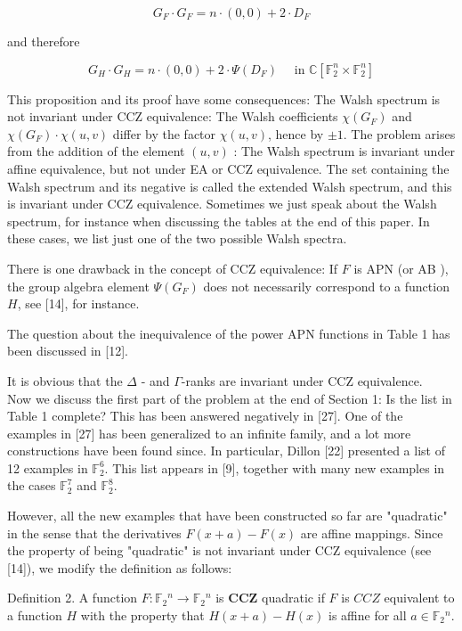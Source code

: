 \documentclass[10pt]{article}
\begin{document}
$$
G_{F} \cdot G_{F}=n \cdot(0,0)+2 \cdot D_{F}
$$

and therefore

$$
G_{H} \cdot G_{H}=n \cdot(0,0)+2 \cdot \Psi\left(D_{F}\right) \quad \text { in } \mathbb{C}\left[\mathbb{F}_{2}^{n} \times \mathbb{F}_{2}^{n}\right]
$$

This proposition and its proof have some consequences: The Walsh spectrum is not invariant under CCZ equivalence: The Walsh coefficients $\chi\left(G_{F}\right)$ and $\chi\left(G_{F}\right) \cdot \chi(u, v)$ differ by the factor $\chi(u, v)$, hence by $\pm 1$. The problem arises from the addition of the element $(u, v)$ : The Walsh spectrum is invariant under affine equivalence, but not under EA or CCZ equivalence. The set containing the Walsh spectrum and its negative is called the extended Walsh spectrum, and this is invariant under CCZ equivalence. Sometimes we just speak about the Walsh spectrum, for instance when discussing the tables at the end of this paper. In these cases, we list just one of the two possible Walsh spectra.

There is one drawback in the concept of CCZ equivalence: If $F$ is APN (or AB ), the group algebra element $\Psi\left(G_{F}\right)$ does not necessarily correspond to a function $H$, see [14], for instance.

The question about the inequivalence of the power APN functions in Table 1 has been discussed in [12].

It is obvious that the $\Delta$ - and $\Gamma$-ranks are invariant under CCZ equivalence.\\[0pt]
Now we discuss the first part of the problem at the end of Section 1: Is the list in Table 1 complete? This has been answered negatively in [27]. One of the examples in [27] has been generalized to an infinite family, and a lot more constructions have been found since. In particular, Dillon [22] presented a list of 12 examples in $\mathbb{F}_{2}^{6}$. This list appears in [9], together with many new examples in the cases $\mathbb{F}_{2}^{7}$ and $\mathbb{F}_{2}^{8}$.

However, all the new examples that have been constructed so far are "quadratic" in the sense that the derivatives $F(x+a)-F(x)$ are affine mappings. Since the property of being "quadratic" is not invariant under CCZ equivalence (see [14]), we modify the definition as follows:

Definition 2. A function $F: \mathbb{F}_{2}{ }^{n} \rightarrow \mathbb{F}_{2}{ }^{n}$ is $\mathbf{C C Z}$ quadratic if $F$ is $C C Z$ equivalent to a function $H$ with the property that $H(x+a)-H(x)$ is affine for all $a \in \mathbb{F}_{2}{ }^{n}$.
\end{document}
